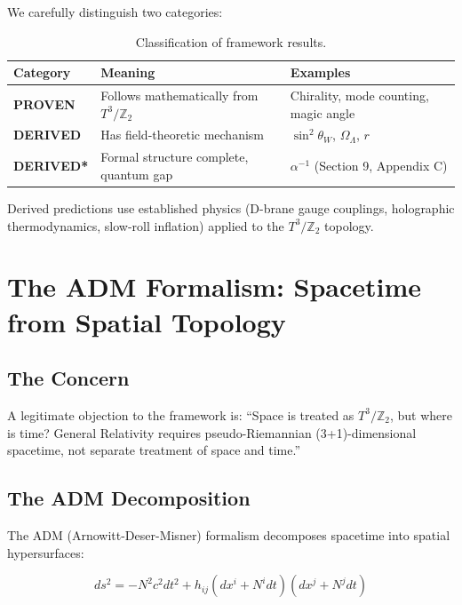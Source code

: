 \documentclass[12pt,a4paper]{article}
\newcommand{\Ztwo}{\mathbb{Z}_2}
\newcommand{\Tthree}{T^3}
\newcommand{\OmegaL}{\Omega_\Lambda}
\newcommand{\sinW}{\sin^2\theta_W}
\begin{document}
We carefully distinguish two categories:

\begin{table}[H]
\centering
\begin{tabular}{lll}
\toprule
\textbf{Category} & \textbf{Meaning} & \textbf{Examples} \\
\midrule
\textbf{PROVEN} & Follows mathematically from $\Tthree/\Ztwo$ & Chirality, mode counting, magic angle \\
\textbf{DERIVED} & Has field-theoretic mechanism & $\sinW$, $\OmegaL$, $r$ \\
\textbf{DERIVED*} & Formal structure complete, quantum gap & $\alpha^{-1}$ (Section 9, Appendix C) \\
\bottomrule
\end{tabular}
\caption{Classification of framework results.}
\end{table}

Derived predictions use established physics (D-brane gauge couplings, holographic thermodynamics, slow-roll inflation) applied to the $\Tthree/\Ztwo$ topology.

\section{The ADM Formalism: Spacetime from Spatial Topology}
\label{sec:adm}

\subsection{The Concern}

A legitimate objection to the framework is: ``Space is treated as $\Tthree/\Ztwo$, but where is time? General Relativity requires pseudo-Riemannian (3+1)-dimensional spacetime, not separate treatment of space and time.''

\subsection{The ADM Decomposition}

The ADM (Arnowitt-Deser-Misner) formalism decomposes spacetime into spatial hypersurfaces:

\begin{equation}
ds^2 = -N^2 c^2 dt^2 + h_{ij}(dx^i + N^i dt)(dx^j + N^j dt)
\end{equation}
\end{document}
